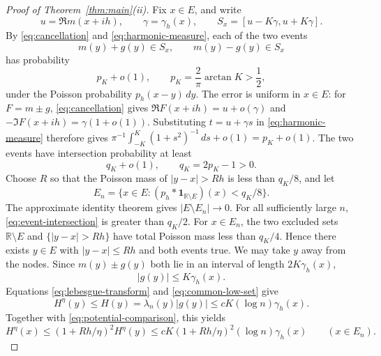 \documentclass[11pt]{article}
\theoremstyle{remark}
\numberwithin{equation}{section}
\newcommand{\R}{\mathbb R}
\begin{document}
\begin{proof}[Proof of Theorem~\ref{thm:main}(ii)]
Fix \(x\in E\), and write
\[
 u=\Re m(x+ih),\qquad\gamma=\gamma_h(x),\qquad
 S_x=[u-K\gamma,u+K\gamma].
\]
By \eqref{eq:cancellation} and \eqref{eq:harmonic-measure}, each of the two events
\[
 m(y)+g(y)\in S_x,\qquad m(y)-g(y)\in S_x
\]
has probability
\[
 p_K+o(1),\qquad p_K=\frac2\pi\arctan K>\frac12,
\]
under the Poisson probability \(p_h(x-y)\,dy\). The error is uniform in \(x\in
E\): for \(F=m\pm g\), \eqref{eq:cancellation} gives
\(\Re F(x+ih)=u+o(\gamma)\) and
\(-\Im F(x+ih)=\gamma(1+o(1))\). Substituting \(t=u+\gamma s\)
in \eqref{eq:harmonic-measure} therefore gives
\(\pi^{-1}\int_{-K}^K(1+s^2)^{-1}\,ds+o(1)=p_K+o(1)\).
The two events have intersection probability at least
\begin{equation}\label{eq:event-intersection}
 q_K+o(1),\qquad q_K=2p_K-1>0.
\end{equation}
Choose \(R\) so that the Poisson mass of \(|y-x|>Rh\) is less than \(q_K/8\),
and let
\[
 E_n=\{x\in E:(p_h*\mathbf1_{\mathbb R\setminus E})(x)<q_K/8\}.
\]
The approximate identity theorem gives \(|E\setminus E_n|\to0\). For all
sufficiently large \(n\), \eqref{eq:event-intersection} is greater than
\(q_K/2\). For \(x\in E_n\), the two excluded sets
\(\R\setminus E\) and \(\{|y-x|>Rh\}\) have total Poisson mass
less than \(q_K/4\). Hence there exists \(y\in E\) with
\(|y-x|\le Rh\) and both events true. We may take \(y\) away from
the nodes. Since \(m(y)\pm g(y)\) both lie in an interval of length
\(2K\gamma_h(x)\),
\[
 |g(y)|\le K\gamma_h(x).
\]
Equations \eqref{eq:lebesgue-transform} and \eqref{eq:common-low-set} give
\[
 H^\eta(y)\le H(y)=\lambda_n(y)|g(y)|
 \le cK(\log n)\gamma_h(x).
\]
Together with \eqref{eq:potential-comparison}, this yields
\begin{equation}\label{eq:local-comparison}
 H^\eta(x)\le(1+Rh/\eta)^2H^\eta(y)
 \le cK(1+Rh/\eta)^2(\log n)\gamma_h(x)
 \qquad(x\in E_n).
\end{equation}


\end{proof}
\end{document}
